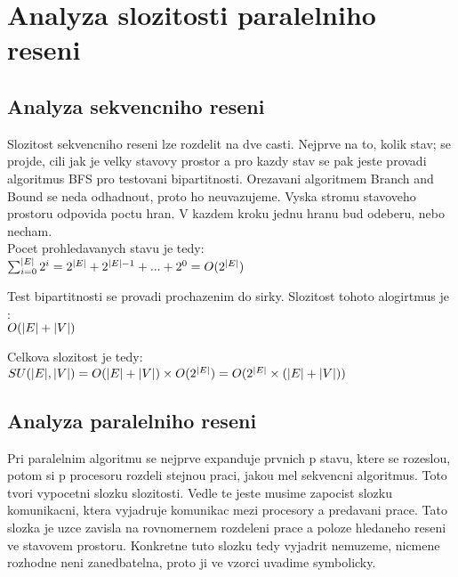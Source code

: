 \section{Analyza slozitosti paralelniho reseni}

\subsection{Analyza sekvencniho reseni}
Slozitost sekvencniho reseni lze rozdelit na dve casti. Nejprve na to, kolik stav; se projde, cili jak je velky stavovy prostor a pro kazdy stav se pak jeste provadi algoritmus BFS pro testovani bipartitnosti.
Orezavani algoritmem Branch and Bound se neda odhadnout, proto ho neuvazujeme. Vyska stromu stavoveho prostoru odpovida poctu hran. V kazdem kroku jednu hranu bud odeberu, nebo necham. \\

Pocet prohledavanych stavu je tedy:\\

\begin{math}
\sum_{i = 0}^{|E|} 2^i = 2^{|E|} + 2^{|E|-1} + ... + 2^0 = O(2^{|E|})\\
\end{math}

Test bipartitnosti se provadi prochazenim do sirky. Slozitost tohoto alogirtmus je :\\

\begin{math}
O(|E| + |V|)\\
\end{math}

Celkova slozitost je tedy:\\

\begin{math}
SU(|E|, |V|) = O(|E| + |V|) \times O(2^{|E|}) = O(2^{|E|} \times (|E| + |V|))\\
\end{math}


\subsection{Analyza paralelniho reseni}
Pri paralelnim algoritmu se nejprve expanduje prvnich p stavu, ktere se rozeslou, potom si p procesoru rozdeli stejnou praci, jakou mel sekvencni algoritmus. Toto tvori vypocetni slozku slozitosti. Vedle te jeste musime zapocist slozku komunikacni, ktera vyjadruje komunikac mezi procesory a predavani prace. Tato slozka je uzce zavisla na rovnomernem rozdeleni prace a poloze hledaneho reseni ve stavovem prostoru. Konkretne tuto slozku tedy vyjadrit nemuzeme, nicmene rozhodne neni zanedbatelna, proto ji ve vzorci uvadime symbolicky.\\

